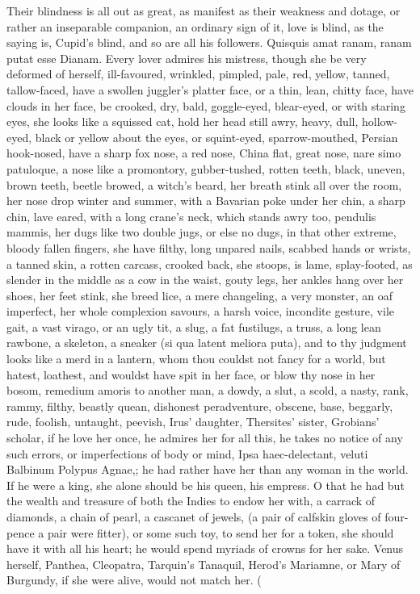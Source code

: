 Their blindness is all out as great, as manifest as their weakness and
dotage, or rather an inseparable companion, an ordinary sign of it,
love is blind, as the saying is, Cupid's blind, and so are all
his followers. Quisquis amat ranam, ranam putat esse Dianam. Every
lover admires his mistress, though she be very deformed of herself,
ill-favoured, wrinkled, pimpled, pale, red, yellow, tanned,
tallow-faced, have a swollen juggler's platter face, or a thin, lean,
chitty face, have clouds in her face, be crooked, dry, bald,
goggle-eyed, blear-eyed, or with staring eyes, she looks like a
squissed cat, hold her head still awry, heavy, dull, hollow-eyed, black
or yellow about the eyes, or squint-eyed, sparrow-mouthed, Persian
hook-nosed, have a sharp fox nose, a red nose, China flat, great nose,
nare simo patuloque, a nose like a promontory, gubber-tushed, rotten
teeth, black, uneven, brown teeth, beetle browed, a witch's beard, her
breath stink all over the room, her nose drop winter and summer, with a
Bavarian poke under her chin, a sharp chin, lave eared, with a long
crane's neck, which stands awry too, pendulis mammis, her dugs like two
double jugs, or else no dugs, in that other extreme, bloody fallen
fingers, she have filthy, long unpared nails, scabbed hands or wrists,
a tanned skin, a rotten carcass, crooked back, she stoops, is lame,
splay-footed, as slender in the middle as a cow in the waist, gouty
legs, her ankles hang over her shoes, her feet stink, she breed lice, a
mere changeling, a very monster, an oaf imperfect, her whole complexion
savours, a harsh voice, incondite gesture, vile gait, a vast virago, or
an ugly tit, a slug, a fat fustilugs, a truss, a long lean rawbone, a
skeleton, a sneaker (si qua latent meliora puta), and to thy judgment
looks like a merd in a lantern, whom thou couldst not fancy for a
world, but hatest, loathest, and wouldst have spit in her face, or blow
thy nose in her bosom, remedium amoris to another man, a dowdy, a slut,
a scold, a nasty, rank, rammy, filthy, beastly quean, dishonest
peradventure, obscene, base, beggarly, rude, foolish, untaught,
peevish, Irus' daughter, Thersites' sister, Grobians' scholar, if he
love her once, he admires her for all this, he takes no notice of any
such errors, or imperfections of body or mind, Ipsa
haec-delectant, veluti Balbinum Polypus Agnae,; he had rather have her
than any woman in the world. If he were a king, she alone should be his
queen, his empress. O that he had but the wealth and treasure of both
the Indies to endow her with, a carrack of diamonds, a chain of pearl,
a cascanet of jewels, (a pair of calfskin gloves of four-pence a pair
were fitter), or some such toy, to send her for a token, she should
have it with all his heart; he would spend myriads of crowns for her
sake. Venus herself, Panthea, Cleopatra, Tarquin's Tanaquil, Herod's
Mariamne, or Mary of Burgundy, if she were alive, would not match
her.
(

